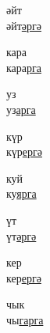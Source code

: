 \begin{multicols}{4}
\begin{enumerate}
\begin{minipage}{\linewidth}
    \item
    әйт\\
    әйт\underline{әр}\underline{гә}\\
\end{minipage}

\begin{minipage}{\linewidth}
    \item
    кара\\
    кара\underline{р}\underline{га}\\
\end{minipage}

\begin{minipage}{\linewidth}
    \item
    уз\\
    уз\underline{ар}\underline{га}\\
\end{minipage}

\begin{minipage}{\linewidth}
    \item
    күр\\
    күр\underline{ер}\underline{гә}\\
\end{minipage}

\begin{minipage}{\linewidth}
    \item
    куй\\
    ку\underline{яр}\underline{га}\\
\end{minipage}

\begin{minipage}{\linewidth}
    \item
    үт\\
    үт\underline{әр}\underline{гә}\\
\end{minipage}

\begin{minipage}{\linewidth}
    \item
    кер\\
    кер\underline{ер}\underline{гә}\\
\end{minipage}

\begin{minipage}{\linewidth}
    \item
    чык\\
    чы\underline{гар}\underline{га}\\
\end{minipage}


\end{enumerate}
\end{multicols}
